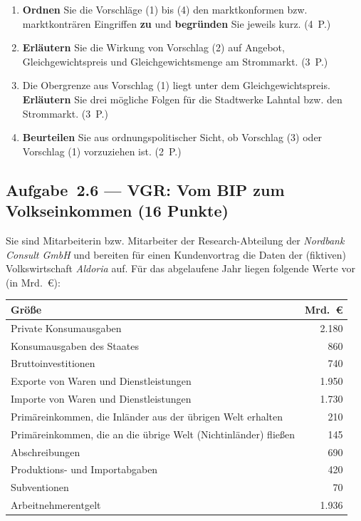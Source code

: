 \begin{enumerate}[label=\alph*)]
  \item \textbf{Ordnen} Sie die Vorschläge (1) bis (4) den marktkonformen bzw.
    marktkonträren Eingriffen \textbf{zu} und \textbf{begründen} Sie jeweils kurz.
    \hfill (4~P.)
  \item \textbf{Erläutern} Sie die Wirkung von Vorschlag (2) auf Angebot,
    Gleichgewichtspreis und Gleichgewichtsmenge am Strommarkt. \hfill (3~P.)
  \item Die Obergrenze aus Vorschlag (1) liegt unter dem Gleichgewichtspreis.
    \textbf{Erläutern} Sie drei mögliche Folgen für die Stadtwerke Lahntal bzw. den
    Strommarkt. \hfill (3~P.)
  \item \textbf{Beurteilen} Sie aus ordnungspolitischer Sicht, ob Vorschlag (3) oder
    Vorschlag (1) vorzuziehen ist. \hfill (2~P.)
\end{enumerate}

\subsection*{Aufgabe~2.6 --- VGR: Vom BIP zum Volkseinkommen (16 Punkte)}

Sie sind Mitarbeiterin bzw. Mitarbeiter der Research-Abteilung der \emph{Nordbank Consult
GmbH} und bereiten für einen Kundenvortrag die Daten der (fiktiven) Volkswirtschaft
\emph{Aldoria} auf. Für das abgelaufene Jahr liegen folgende Werte vor (in Mrd.~€):

\begin{center}
\begin{tabular}{l r}
\toprule
\rowcolor{bfwTabHead} \textbf{Größe} & \textbf{Mrd.~€}\\
\midrule
Private Konsumausgaben & 2.180\\
Konsumausgaben des Staates & 860\\
Bruttoinvestitionen & 740\\
Exporte von Waren und Dienstleistungen & 1.950\\
Importe von Waren und Dienstleistungen & 1.730\\
Primäreinkommen, die Inländer aus der übrigen Welt erhalten & 210\\
Primäreinkommen, die an die übrige Welt (Nichtinländer) fließen & 145\\
Abschreibungen & 690\\
Produktions- und Importabgaben & 420\\
Subventionen & 70\\
Arbeitnehmerentgelt & 1.936\\
\bottomrule
\end{tabular}
\end{center}


